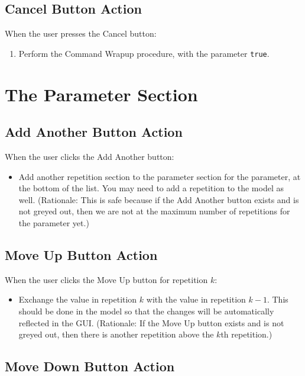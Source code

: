 \documentclass[11pt]{article}
\begin{document}
\subsection{Cancel Button Action}

When the user presses the Cancel button:
\begin{enumerate}
\item Perform the Command Wrapup procedure, with the parameter {\tt true}.
\end{enumerate}

\section{The Parameter Section}

\subsection{Add Another Button Action}

When the user clicks the Add Another button:
\begin{itemize}
\item Add another repetition section to the parameter section for the
  parameter, at the bottom of the list.  You may need to add a repetition
  to the model as well.
  (Rationale:  This is safe because if the Add Another button exists
  and is not greyed out, then we are not at the maximum number of
  repetitions for the parameter yet.)
\end{itemize}

\subsection{Move Up Button Action}

When the user clicks the Move Up button for repetition $k$:
\begin{itemize}
\item Exchange the value in repetition $k$ with the value in repetition $k-1$.
  This should be done in the model so that the changes will be automatically
  reflected in the GUI.
  (Rationale:  If the Move Up button exists and is not greyed out, then
  there is another repetition above the $k$th repetition.)
\end{itemize}

\subsection{Move Down Button Action}
\end{document}

